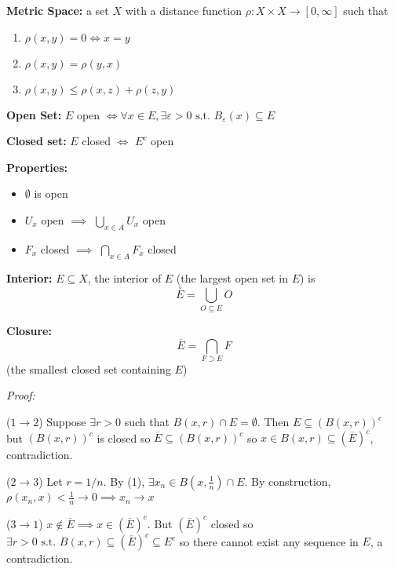 \documentclass[12pt]{article}
\newcommand{\ep}{\varepsilon}
\newcommand{\sub}{\subseteq}
\newcommand{\st}{\text{ s.t. }}
\renewcommand{\bar}[1]{\overline{#1}}
\newenvironment*{tbox}[2][gray]{
    \begin{tcolorbox}[
        parbox=false,
        colback=#1!5!white,
        colframe=#1!75!black,
        breakable,
        title={#2}
    ]}
    {\end{tcolorbox}}
\begin{document}
    \textbf{Metric Space:} a set $X$ with a distance function $\rho: X \times X \to [0, \infty]$ such that 
    \begin{enumerate}
        \item $\rho(x, y) = 0 \iff x = y$
        \item $\rho(x, y) = \rho(y, x)$
        \item $\rho(x, y) \leq \rho(x, z) + \rho(z, y)$
    \end{enumerate}

    \textbf{Open Set:} $E$ open $\iff \forall x \in E, \exists \ep > 0 \st B_{\ep}(x) \sub E$

    \textbf{Closed set:} $E$ closed $\iff$ $E^c$ open

    \textbf{Properties:}
    \begin{itemize}
        \item $\emptyset$ is open 
        \item $U_x$ open $\implies$ $\bigcup_{x \in A} U_x$ open 
        \item $F_x$ closed $\implies$ $\bigcap_{x \in A} F_x$ closed
    \end{itemize}

    \textbf{Interior:} $E \sub X$, the interior of $E$ (the largest open set in $E$) is 
    \[\overset{\,\circ}{E} = \bigcup_{O \sub E} O\]

    \textbf{Closure:} 
    \[\bar{E} = \bigcap_{F \supset E} F\]
    (the smallest closed set containing $E$)

    \begin{tbox}{\textbf{Proposition:} Let $(X, \rho)$ be a metric space with $E \sub X$ and $x \in X$. The following are equivalent:
        \begin{enumerate}
            \item $x \in \bar E$
            \item $B(x, r) \cap E \neq \emptyset$ for all $r > 0$
            \item $\exists \{x_n\} \sub E \st x_n \to x$
        \end{enumerate} }
        \emph{Proof:} 

        ($1 \to 2$) Suppose $\exists r > 0$ such that $B(x, r) \cap E = \emptyset$. Then $E \sub (B(x, r))^c$ but $(B(x, r))^c$ is closed so $\bar E \sub (B(x, r))^c$ so $x \in B(x, r) \sub (\bar E)^c$, contradiction. 

        ($2 \to 3$) Let $r = 1/n$. By (1), $\exists x_n \in B(x, \frac{1}{n}) \cap E$. By construction, $\rho(x_n, x) < \frac{1}{n} \to 0 \implies x_n \to x$ 

        ($3 \to 1$) $x \notin \bar E \implies x \in (\bar E)^c$. But $(\bar E)^c$ closed so $\exists r > 0 \st B(x, r) \sub (\bar E)^c \sub E^c$ so there cannot exist any sequence in $E$, a contradiction. 
    \end{tbox}
\end{document}
